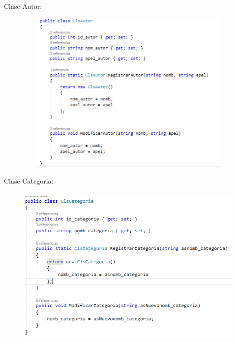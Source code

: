 \documentclass[12pt]{article}
\begin{document}
\begin{enumerate}[label*=\arabic*.]
\begin{enumerate}[label*=\arabic*.]
Clase Autor:
\begin{figure}[H]
	\begin{Center}
		\includegraphics[width=4.91in,height=3.15in]{./media/1.png}
	\end{Center}
\end{figure}

\newpage
Clase Categoria:
\begin{figure}[H]
	\begin{Center}
		\includegraphics[width=4.91in,height=3.15in]{./media/2.png}
	\end{Center}
\end{figure}



\end{enumerate}
\end{enumerate}
\end{document}
